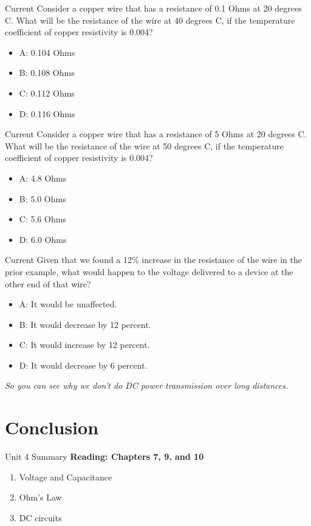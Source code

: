 \documentclass{beamer}
\begin{document}
\begin{frame}{Current}
Consider a copper wire that has a resistance of 0.1 Ohms at 20 degrees C.  What will be the resistance of the wire at 40 degrees C, if the temperature coefficient of copper resistivity is 0.004?
\begin{itemize}
\item A: 0.104 Ohms
\item B: 0.108 Ohms
\item C: 0.112 Ohms
\item D: 0.116 Ohms
\end{itemize}
\end{frame}

\begin{frame}{Current}
Consider a copper wire that has a resistance of 5 Ohms at 20 degrees C.  What will be the resistance of the wire at 50 degrees C, if the temperature coefficient of copper resistivity is 0.004?
\begin{itemize}
\item A: 4.8 Ohms
\item B: 5.0 Ohms
\item C: 5.6 Ohms
\item D: 6.0 Ohms
\end{itemize}
\end{frame}

\begin{frame}{Current}
Given that we found a 12\% increase in the resistance of the wire in the prior example, what would happen to the voltage delivered to a device at the other end of that wire?
\begin{itemize}
\item A: It would be unaffected.
\item B: It would decrease by 12 percent.
\item C: It would increase by 12 percent.
\item D: It would decrease by 6 percent.
\end{itemize}
\textit{So you can see why we don't do DC power transmission over long distances.}
\end{frame}

\section{Conclusion}

\begin{frame}{Unit 4 Summary}
\textbf{Reading: Chapters 7, 9, and 10}
\begin{enumerate}
\item \alert{Voltage and Capacitance}
\item Ohm's Law
\item DC circuits
\end{enumerate}
\end{frame}
\end{document}
